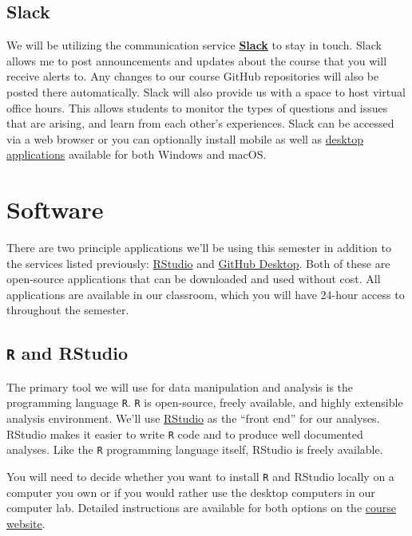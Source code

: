 \documentclass[]{book}
\theoremstyle{definition}
\theoremstyle{definition}
\theoremstyle{definition}
\theoremstyle{remark}
\begin{document}
\hypertarget{slack}{%
\subsection{Slack}\label{slack}}

We will be utilizing the communication service
\textbf{\href{https://slack.com}{Slack}} to stay in touch. Slack allows
me to post announcements and updates about the course that you will
receive alerts to. Any changes to our course GitHub repositories will
also be posted there automatically. Slack will also provide us with a
space to host virtual office hours. This allows students to monitor the
types of questions and issues that are arising, and learn from each
other's experiences. Slack can be accessed via a web browser or you can
optionally install mobile as well as
\href{https://slack.com/downloads/osx}{desktop applications} available
for both Windows and macOS.

\hypertarget{software}{%
\section{Software}\label{software}}

There are two principle applications we'll be using this semester in
addition to the services listed previously:
\href{https://www.rstudio.com}{RStudio} and
\href{https://desktop.github.com}{GitHub Desktop}. Both of these are
open-source applications that can be downloaded and used without cost.
All applications are available in our classroom, which you will have
24-hour access to throughout the semester.

\hypertarget{r-and-rstudio}{%
\subsection{\texorpdfstring{\texttt{R} and
RStudio}{R and RStudio}}\label{r-and-rstudio}}

The primary tool we will use for data manipulation and analysis is the
programming language \texttt{R}. \texttt{R} is open-source, freely
available, and highly extensible analysis environment. We'll use
\href{https://www.rstudio.com}{RStudio} as the ``front end'' for our
analyses. RStudio makes it easier to write \texttt{R} code and to
produce well documented analyses. Like the \texttt{R} programming
language itself, RStudio is freely available.

You will need to decide whether you want to install \texttt{R} and
RStudio locally on a computer you own or if you would rather use the
desktop computers in our computer lab. Detailed instructions are
available for both options on the
\href{https://slu-soc5050.github.io/course-software/}{course website}.
\end{document}
